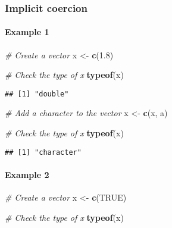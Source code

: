 \documentclass[
]{article}
\newenvironment{Shaded}{\begin{snugshade}}{\end{snugshade}}
\newcommand{\CommentTok}[1]{\textcolor[rgb]{0.56,0.35,0.01}{\textit{#1}}}
\newcommand{\ConstantTok}[1]{\textcolor[rgb]{0.56,0.35,0.01}{#1}}
\newcommand{\FloatTok}[1]{\textcolor[rgb]{0.00,0.00,0.81}{#1}}
\newcommand{\FunctionTok}[1]{\textcolor[rgb]{0.13,0.29,0.53}{\textbf{#1}}}
\newcommand{\NormalTok}[1]{#1}
\newcommand{\OtherTok}[1]{\textcolor[rgb]{0.56,0.35,0.01}{#1}}
\newcommand{\StringTok}[1]{\textcolor[rgb]{0.31,0.60,0.02}{#1}}
\begin{document}
\hypertarget{implicit-coercion}{%
\subsubsection{Implicit coercion}\label{implicit-coercion}}

\hypertarget{example-1}{%
\paragraph{Example 1}\label{example-1}}

\begin{Shaded}
\begin{Highlighting}[]
\CommentTok{\# Create a vector}
\NormalTok{x }\OtherTok{\textless{}{-}} \FunctionTok{c}\NormalTok{(}\FloatTok{1.8}\NormalTok{)}

\CommentTok{\# Check the type of x}
\FunctionTok{typeof}\NormalTok{(x)}
\end{Highlighting}
\end{Shaded}

\begin{verbatim}
## [1] "double"
\end{verbatim}

\begin{Shaded}
\begin{Highlighting}[]
\CommentTok{\# Add a character to the vector}
\NormalTok{x }\OtherTok{\textless{}{-}} \FunctionTok{c}\NormalTok{(x, }\StringTok{\textquotesingle{}a\textquotesingle{}}\NormalTok{)}

\CommentTok{\# Check the type of x}
\FunctionTok{typeof}\NormalTok{(x)}
\end{Highlighting}
\end{Shaded}

\begin{verbatim}
## [1] "character"
\end{verbatim}

\hypertarget{example-2}{%
\paragraph{Example 2}\label{example-2}}

\begin{Shaded}
\begin{Highlighting}[]
\CommentTok{\# Create a vector}
\NormalTok{x }\OtherTok{\textless{}{-}} \FunctionTok{c}\NormalTok{(}\ConstantTok{TRUE}\NormalTok{)}

\CommentTok{\# Check the type of x}
\FunctionTok{typeof}\NormalTok{(x)}
\end{Highlighting}
\end{Shaded}
\end{document}

